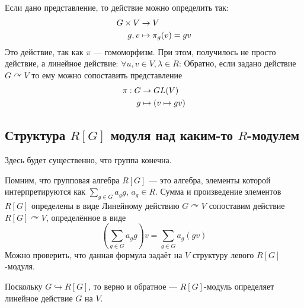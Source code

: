 Если дано представление, то действие можно определить так:
\begin{align*}
    G \times V &\rightarrow V \\ g,v &\mapsto \pi_g(v) = gv
\end{align*}
Это действие, так как $\pi$ --- гомоморфизм.
При этом, получилось не просто действие, а линейное действие: $\forall u, v \in V, \lambda \in R$:
Обратно, если задано действие $G \curvearrowright V$ то ему можно сопоставить представление
\begin{align*}
    \pi: G &\rightarrow GL(V) \\ g &\mapsto (v \mapsto gv)
\end{align*}

\subsection{Структура $R[G]$ модуля над каким-то $R$-модулем}
Здесь будет существенно, что группа конечна.

Помним, что групповая алгебра $R[G]$ --- это алгебра, элементы которой интерпретируются как $\sum\limits_{g \in G}a_g g$, $a_g \in R$.
Сумма и произведение элементов $R[G]$ определены в виде
Линейному действию $G \curvearrowright V$ сопоставим действие $R[G] \curvearrowright V$, определённое в виде
\[\left(\sum\limits_{g \in G}a_g g\right) v = \sum\limits_{g \in G}a_g (gv)\]
Можно проверить, что данная формула задаёт на $V$ структуру левого $R[G]$-модуля.

Поскольку $G \hookrightarrow R[G]$, то верно и обратное --- $R[G]$-модуль определяет линейное действие $G$ на $V$.

